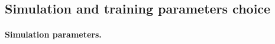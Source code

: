 


\subsection{Simulation and training parameters choice}
\label{subsec:simulation_and_training_parameters_choice}
\paragraph{Simulation parameters.}
\label{subsec:simulation_parameters}

